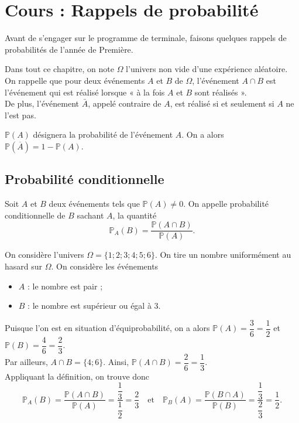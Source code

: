 \documentclass[11pt,fleqn, openany]{book} %
\begin{document}

\chapter*{Cours : Rappels de probabilité}



Avant de s'engager sur le programme de terminale, faisons quelques rappels de probabilités de l'année de Première.

Dans tout ce chapitre, on note $\Omega$ l'univers non vide d'une expérience aléatoire.\\
On rappelle que pour deux événements $A$ et $B$ de $\Omega$, l'événement $A \cap B$ est l'événement qui est réalisé lorsque « à la fois $A$ et $B$ sont réalisés ».\\De plus, l'événement $\bar{A}$, appelé contraire de $A$, est réalisé si et seulement si $A$ ne l'est pas.

$\mathbb{P}(A)$ désignera la probabilité de l'événement $A$. On a alors $\mathbb{P}(\overline{A})=1-\mathbb{P}(A)$.


\section{Probabilité conditionnelle}

\begin{definition}Soit $A$ et $B$ deux événements tels que $\mathbb{P}(A)\neq 0$. On appelle probabilité conditionnelle de $B$ sachant $A$, la quantité
\[ \mathbb{P}_A(B)=\dfrac{\mathbb{P}(A\cap B)}{\mathbb{P}(A)}.\]\end{definition}

\begin{example} On considère l'univers $\Omega = \{ 1;2;3;4;5;6\}$. On tire un nombre uniformément au hasard sur $\Omega$. On  considère les événements
\begin{itemize}
\item $A$ : le nombre est pair ;
\item $B$ : le nombre est supérieur ou égal à 3.
\end{itemize}
Puisque l'on est en situation d'équiprobabilité, on a alors $\mathbb{P}(A)=\dfrac{3}{6}=\dfrac{1}{2}$ et $\mathbb{P}(B)=\dfrac{4}{6}=\dfrac{2}{3}$.\\
Par ailleurs, $A\cap B = \{4;6\}$. Ainsi, $\mathbb{P}(A \cap B) = \dfrac{2}{6}=\dfrac{1}{3}$.\\
Appliquant la définition, on trouve donc 
\[ \mathbb{P}_A(B)=\dfrac{\mathbb{P}(A\cap B)}{\mathbb{P}(A)}=\dfrac{\dfrac{1}{3}}{\dfrac{1}{2}}=\dfrac{2}{3}\quad
\text{et} 
\quad \mathbb{P}_B(A)=\dfrac{\mathbb{P}(B\cap A)}{\mathbb{P}(B)}=\dfrac{\dfrac{1}{3}}{\dfrac{2}{3}}=\dfrac{1}{2}.\]
\end{example}
\end{document}
